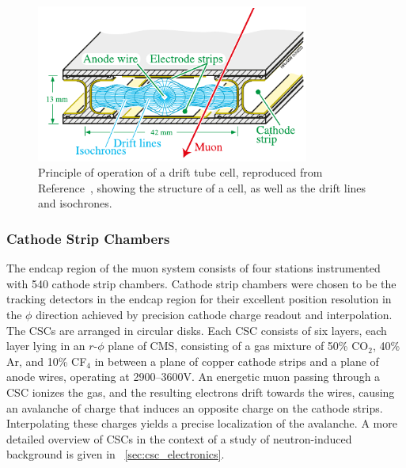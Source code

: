 \begin{figure}[tpb]
  \centering
  \includegraphics[width=0.8\textwidth]{figures/cms/DT.pdf}
  \caption{Principle of operation of a drift tube cell, reproduced from Reference~\cite{Chatrchyan:2013sba}, showing the structure of a cell, as well as the drift lines and isochrones.}
  \label{cms:dt}
\end{figure}

\subsubsection{Cathode Strip Chambers}
The endcap region of the muon system consists of four stations instrumented with 540 cathode strip chambers.
Cathode strip chambers were chosen to be the tracking detectors in the endcap region for their excellent position resolution in the $\phi$ direction achieved by precision cathode charge readout and interpolation.
The CSCs are arranged in circular disks.
Each CSC consists of six layers, each layer lying in an $r$-$\phi$ plane of CMS, consisting of a gas mixture of 50\% CO$_2$, 40\% Ar, and 10\% CF$_4$ in between a plane of copper cathode strips and a plane of anode wires, operating at 2900--3600\unit{V}.
An energetic muon passing through a CSC ionizes the gas, and the resulting electrons drift towards the wires, causing an avalanche of charge that induces an opposite charge on the cathode strips.
Interpolating these charges yields a precise localization of the avalanche.
A more detailed overview of CSCs in the context of a study of neutron-induced background is given in \Sec~\ref{sec:csc_electronics}.


